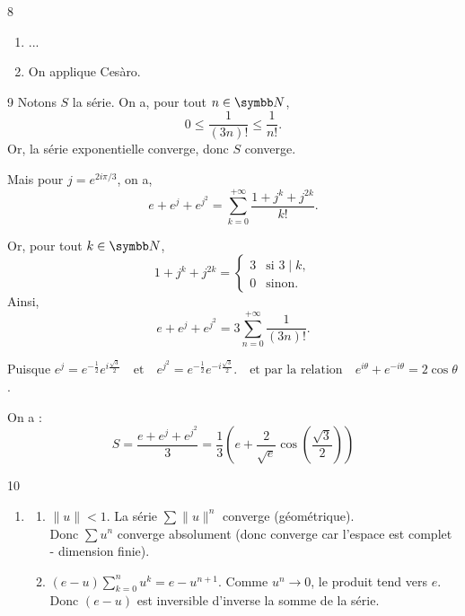 \begin{correction}{8}
\begin{enumerate}
    \item ...
    \item On applique Cesàro.
\end{enumerate}
\end{correction}

\begin{correction}{9}
    Notons $S$ la série. On a, pour tout $n\in\N$,
    \[
    0\leq \frac{1}{(3n)!}\leq \frac{1}{n!}.
    \]
    Or, la série exponentielle converge, donc $S$ converge.
    
    Mais pour $j=e^{2i\pi/3}$, on a,
    \[
    e+e^j+e^{j^2}
    =\sum_{k=0}^{+\infty}\frac{1+j^k+j^{2k}}{k!}.
    \]
    
    Or, pour tout $k\in\N$,
    \[
    1+j^k+j^{2k}=
    \begin{cases}
        3 & \text{si } 3\mid k,\\
        0 & \text{sinon}.
    \end{cases}
    \]
    Ainsi,
    \[
    e+e^j+e^{j^2}
    =3\sum_{n=0}^{+\infty}\frac{1}{(3n)!}.
    \]
    
    Puisque $ e^j=e^{-\frac12}e^{i\frac{\sqrt{3}}{2}}
    \quad\text{et}\quad
    e^{j^2}=e^{-\frac12}e^{-i\frac{\sqrt{3}}{2}}.
    \quad\text{et par la relation}\quad
    e^{i\theta}+e^{-i\theta} = 2 \cos \theta
    $.
     
    On a :
    \[
    S = \frac{e+e^j+e^{j^2}}{3}
    = \frac13\left(e+\frac{2}{\sqrt{e}}\cos\left(\frac{\sqrt{3}}{2}\right)\right)
    \]
\end{correction}

\begin{correction}{10}
\begin{enumerate}
    \item
    \begin{enumerate}
        \item $\|u\| < 1$. La série $\sum \|u\|^n$ converge (géométrique). \\
            Donc $\sum u^n$ converge absolument (donc converge car l'espace est complet - dimension finie).
        
        \item $(e-u) \sum_{k=0}^n u^k = e - u^{n+1}$.
            Comme $u^n \to 0$, le produit tend vers $e$. \\
            Donc $(e-u)$ est inversible d'inverse la somme de la série.
    \end{enumerate}
\end{enumerate}
\end{correction}

